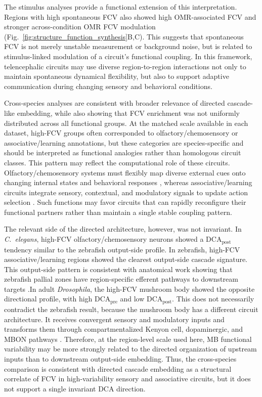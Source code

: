 \documentclass[9pt,twocolumn,twoside]{pnas-new}
\begin{document}
The stimulus analyses provide a functional extension of this interpretation. Regions with high spontaneous FCV also showed high OMR-associated FCV and stronger across-condition OMR FCV modulation (Fig.~\ref{fig:structure_function_synthesis}B,C). This suggests that spontaneous FCV is not merely unstable measurement or background noise, but is related to stimulus-linked modulation of a circuit's functional coupling. In this framework, telencephalic circuits may use diverse region-to-region interactions not only to maintain spontaneous dynamical flexibility, but also to support adaptive communication during changing sensory and behavioral conditions.

Cross-species analyses are consistent with broader relevance of directed cascade-like embedding, while also showing that FCV enrichment was not uniformly distributed across all functional groups. At the matched scale available in each dataset, high-FCV groups often corresponded to olfactory/chemosensory or associative/learning annotations, but these categories are species-specific and should be interpreted as functional analogies rather than homologous circuit classes. This pattern may reflect the computational role of these circuits. Olfactory/chemosensory systems must flexibly map diverse external cues onto changing internal states and behavioral responses \citep{Bargmann2006Chemosensation,Leinwand2016OlfactoryNematodes}, whereas associative/learning circuits integrate sensory, contextual, and modulatory signals to update action selection \citep{Dempsey2022ZebrafishMemorySynapses,Aso2014MushroomBodyArchitecture,Li2020MushroomBodyConnectome}. Such functions may favor circuits that can rapidly reconfigure their functional partners rather than maintain a single stable coupling pattern.

The relevant side of the directed architecture, however, was not invariant. In \textit{C.~elegans}, high-FCV olfactory/chemosensory neurons showed a $\mathrm{DCA}_{\mathrm{post}}$ tendency similar to the zebrafish output-side profile. In zebrafish, high-FCV associative/learning regions showed the clearest output-side cascade signature. This output-side pattern is consistent with anatomical work showing that zebrafish pallial zones have region-specific efferent pathways to downstream targets \citep{Yanez2022ZebrafishPalliumHodology}.In adult \textit{Drosophila}, the high-FCV mushroom body showed the opposite directional profile, with high $\mathrm{DCA}_{\mathrm{pre}}$ and low $\mathrm{DCA}_{\mathrm{post}}$. This does not necessarily contradict the zebrafish result, because the mushroom body has a different circuit architecture. It receives convergent sensory and modulatory inputs and transforms them through compartmentalized Kenyon cell, dopaminergic, and MBON pathways \citep{Aso2014MushroomBodyArchitecture,Li2020MushroomBodyConnectome}. Therefore, at the region-level scale used here, MB functional variability may be more strongly related to the directed organization of upstream inputs than to downstream output-side embedding. Thus, the cross-species comparison is consistent with directed cascade embedding as a structural correlate of FCV in high-variability sensory and associative circuits, but it does not support a single invariant DCA direction.
\end{document}

